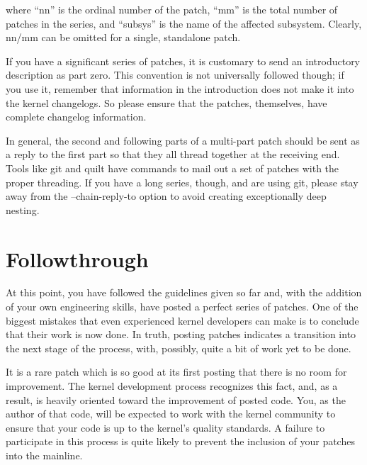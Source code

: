 \documentclass[a4paper,8pt,english]{sphinxmanual}
\begin{document}
where ``nn'' is the ordinal number of the patch, ``mm'' is the total number of
patches in the series, and ``subsys'' is the name of the affected subsystem.
Clearly, nn/mm can be omitted for a single, standalone patch.

If you have a significant series of patches, it is customary to send an
introductory description as part zero.  This convention is not universally
followed though; if you use it, remember that information in the
introduction does not make it into the kernel changelogs.  So please ensure
that the patches, themselves, have complete changelog information.

In general, the second and following parts of a multi-part patch should be
sent as a reply to the first part so that they all thread together at the
receiving end.  Tools like git and quilt have commands to mail out a set of
patches with the proper threading.  If you have a long series, though, and
are using git, please stay away from the --chain-reply-to option to avoid
creating exceptionally deep nesting.


\section{Followthrough}
\label{process/6.Followthrough:followthrough}\label{process/6.Followthrough:development-followthrough}\label{process/6.Followthrough::doc}
At this point, you have followed the guidelines given so far and, with the
addition of your own engineering skills, have posted a perfect series of
patches.  One of the biggest mistakes that even experienced kernel
developers can make is to conclude that their work is now done.  In truth,
posting patches indicates a transition into the next stage of the process,
with, possibly, quite a bit of work yet to be done.

It is a rare patch which is so good at its first posting that there is no
room for improvement.  The kernel development process recognizes this fact,
and, as a result, is heavily oriented toward the improvement of posted
code.  You, as the author of that code, will be expected to work with the
kernel community to ensure that your code is up to the kernel's quality
standards.  A failure to participate in this process is quite likely to
prevent the inclusion of your patches into the mainline.
\end{document}
